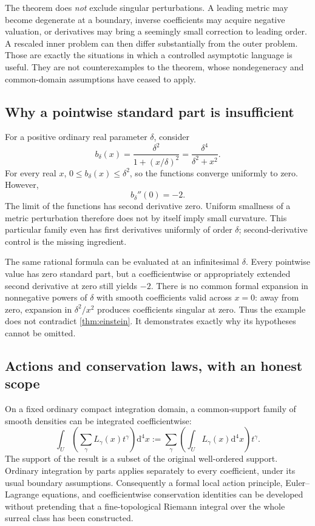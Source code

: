 \documentclass[11pt,a4paper]{article}
\numberwithin{equation}{section}
\theoremstyle{definition}
\theoremstyle{remark}
\newcommand{\dd}{\mathrm d}
\begin{document}
The theorem does \emph{not} exclude singular perturbations. A leading metric may
become degenerate at a boundary, inverse coefficients may acquire negative
valuation, or derivatives may bring a seemingly small correction to leading
order. A rescaled inner problem can then differ substantially from the outer
problem. Those are exactly the situations in which a controlled asymptotic
language is useful. They are not counterexamples to the theorem, whose
nondegeneracy and common-domain assumptions have ceased to apply.

\subsection{Why a pointwise standard part is insufficient}
For a positive ordinary real parameter $\delta$, consider
\begin{equation}\label{eq:boundarylayer}
b_\delta(x)=\frac{\delta^2}{1+(x/\delta)^2}
           =\frac{\delta^4}{\delta^2+x^2}.
\end{equation}
For every real $x$, $0\le b_\delta(x)\le\delta^2$, so the functions converge
uniformly to zero. However,
\begin{equation}\label{eq:boundarylayerder}
b_\delta''(0)=-2.
\end{equation}
The limit of the functions has second derivative zero. Uniform smallness of a
metric perturbation therefore does not by itself imply small curvature. This
particular family even has first derivatives uniformly of order $\delta$;
second-derivative control is the missing ingredient.

The same rational formula can be evaluated at an infinitesimal $\delta$.
Every pointwise value has zero standard part, but a coefficientwise or
appropriately extended second derivative at zero still yields $-2$.
There is no common formal expansion in nonnegative powers of $\delta$ with
smooth coefficients valid across $x=0$: away from zero, expansion in
$\delta^2/x^2$ produces coefficients singular at zero. Thus the example does
not contradict \cref{thm:einstein}. It demonstrates exactly why its hypotheses
cannot be omitted.

\subsection{Actions and conservation laws, with an honest scope}
On a fixed ordinary compact integration domain, a common-support family of
smooth densities can be integrated coefficientwise:
\[
\int_U\left(\sum_\gamma L_\gamma(x)t^\gamma\right)\dd^4x
 :=\sum_\gamma\left(\int_U L_\gamma(x)\dd^4x\right)t^\gamma.
\]
The support of the result is a subset of the original well-ordered support.
Ordinary integration by parts applies separately to every coefficient, under
its usual boundary assumptions. Consequently a formal local action principle,
Euler--Lagrange equations, and coefficientwise conservation identities can be
developed without pretending that a fine-topological Riemann integral over the
whole surreal class has been constructed.
\end{document}
